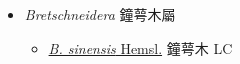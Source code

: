 
  \begin{itemize}
 \item[] \textit{Bretschneidera} 鐘萼木屬
                                
  \begin{itemize}
        \item[] \href{http://www.theplantlist.org/tpl1.1/search?q=Bretschneidera+sinensis}{\textit{B. sinensis} Hemsl.}   鐘萼木   LC
  \end{itemize}
  \end{itemize}
